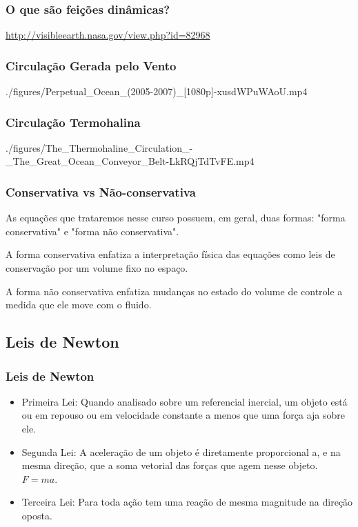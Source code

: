 \begin{frame}
  \frametitle{O que são feições dinâmicas?}
  \begin{center}
  \end{center}
  \tiny\hfill \url{http://visibleearth.nasa.gov/view.php?id=82968}
\end{frame}


\begin{frame}
  \frametitle{Circulação Gerada pelo Vento}
  \begin{center}
  \movie[showcontrols=true]{\shadowbox{\phantom{\rule{8cm}{5cm}}}}
  {./figures/Perpetual_Ocean_(2005-2007)_[1080p]-xusdWPuWAoU.mp4}
  \end{center}
\end{frame}


\begin{frame}
  \frametitle{Circulação Termohalina}
  \begin{center}
  \movie[showcontrols=true]{\shadowbox{\phantom{\rule{8cm}{5cm}}}}
  {./figures/The_Thermohaline_Circulation_-_The_Great_Ocean_Conveyor_Belt-LkRQjTdTvFE.mp4}
  \end{center}
\end{frame}

\begin{frame}
\frametitle{Conservativa vs Não-conservativa}
  \begin{block}{}
    As equações que trataremos nesse curso possuem, em geral, duas formas:
    "forma conservativa" e "forma não conservativa".
  \end{block}

  \begin{block}{}
    A forma conservativa enfatiza a interpretação física das equações como leis
    de conservação por um volume fixo no espaço.

    A forma não conservativa enfatiza mudanças no estado do volume de controle
    a medida que ele move com o fluido.
  \end{block}
\end{frame}

\subsection{Leis de Newton}
\begin{frame}
\frametitle{Leis de Newton}
  \begin{itemize}[<+-| alert@+>]
    \item Primeira Lei: Quando analisado sobre um referencial inercial, um
    objeto está ou em repouso ou em velocidade constante a menos que uma força
    aja sobre ele.

    \item Segunda Lei: A aceleração de um objeto é diretamente proporcional a,
    e na mesma direção, que a soma vetorial das forças que agem nesse objeto.
    $F = ma$.

    \item Terceira Lei: Para toda ação tem uma reação de mesma magnitude na
    direção oposta.
  \end{itemize}
\end{frame}

